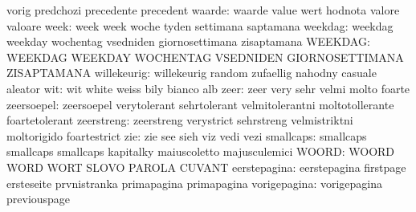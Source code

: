                            vorig                     predchozi
                           precedente                precedent
                   waarde: waarde                    value
                           wert                      hodnota
                           valore                    valoare
                     week: week                      week
                           woche                     tyden
                           settimana                 saptamana
                  weekdag: weekdag                   weekday
                           wochentag                 vsedniden
                           giornosettimana           zisaptamana
                  WEEKDAG: WEEKDAG                   WEEKDAY
                           WOCHENTAG                 VSEDNIDEN
                           GIORNOSETTIMANA           ZISAPTAMANA
              willekeurig: willekeurig               random
                           zufaellig                 nahodny
                           casuale                   aleator
                      wit: wit                       white
                           weiss                     bily
                           bianco                    alb
                     zeer: zeer                      very
                           sehr                      velmi
                           molto                     foarte
               zeersoepel: zeersoepel                verytolerant
                           sehrtolerant              velmitolerantni
                           moltotollerante           foartetolerant
               zeerstreng: zeerstreng                verystrict
                           sehrstreng                velmistriktni
                           moltorigido               foartestrict %
                      zie: zie                       see
                           sieh                      viz
                           vedi                      vezi
                smallcaps: smallcaps                 smallcaps
                           smallcaps                 kapitalky
                           maiuscoletto              majusculemici
                    WOORD: WOORD                     WORD
                           WORT                      SLOVO
                           PAROLA                    CUVANT
             eerstepagina: eerstepagina              firstpage
                           ersteseite                prvnistranka
                           primapagina               primapagina
             vorigepagina: vorigepagina              previouspage

